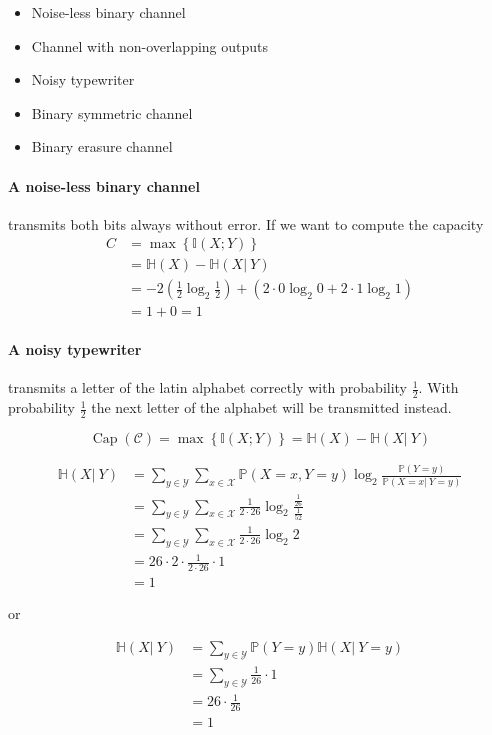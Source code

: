 \documentclass[a4paper]{article}
\newcommand\op[2][P]{\mathbb{#1}\left(#2\right)}
\newcommand\cond[3][P]{\mathbb{#1}\left(#2 \left|\:#3\right)\right.}
\DeclareMathOperator{\Capacity}{Cap}
\theoremstyle{definition}
\begin{document}
\begin{itemize}
  \item Noise-less binary channel
  \item Channel with non-overlapping outputs
  \item Noisy typewriter
  \item Binary symmetric channel
  \item Binary erasure channel
\end{itemize}

\paragraph{A noise-less binary channel}
transmits both bits always without error.
If we want to compute the capacity
\begin{align*}
  C &= \max\left\{\op[I]{X;Y}\right\} \\
    &= \op[H]{X} - \cond[H]XY \\
    &= -2\left(\frac12 \log_2 \frac12\right) + \left(2 \cdot 0 \log_2 0 + 2 \cdot 1 \log_2 1\right) \\
    &= 1 + 0 = 1
\end{align*}

\paragraph{A noisy typewriter} transmits a letter of the latin alphabet correctly with probability $\frac12$. With probability $\frac12$ the next letter of the alphabet will be transmitted instead.

\[ \Capacity(\mathcal C) = \max\left\{\op[I]{X;Y}\right\} = \op[H]{X} - \cond[H]{X}{Y} \]

\begin{align*}
  \cond[H]{X}{Y} &= \sum_{y \in \mathcal Y} \sum_{x \in \mathcal X} \op{X=x,Y=y} \log_2 \frac{\op{Y=y}}{\cond{X=x}{Y=y}} \\
                 &= \sum_{y \in \mathcal Y} \sum_{x \in \mathcal X} \frac1{2\cdot 26} \log_2 \frac{\frac{1}{26}}{\frac{1}{52}} \\
                 &= \sum_{y \in \mathcal Y} \sum_{x \in \mathcal X} \frac{1}{2\cdot 26} \log_2 2 \\
                 &= 26 \cdot 2 \cdot \frac{1}{2\cdot 26} \cdot 1 \\
                 &= 1
\end{align*}

or

\begin{align*}
  \cond[H]{X}{Y} &= \sum_{y \in \mathcal Y} \op{Y=y} \cond[H]{X}{Y=y} \\
                 &= \sum_{y \in \mathcal Y} \frac1{26} \cdot 1 \\
                 &= 26 \cdot \frac1{26} \\
                 &= 1
\end{align*}
\end{document}
